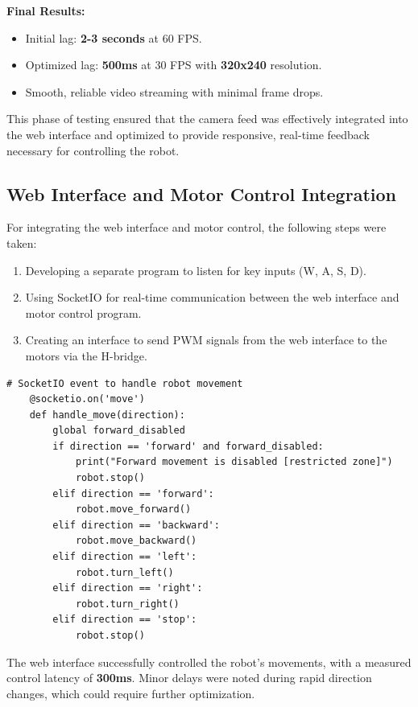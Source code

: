 \textbf{Final Results:}
\begin{itemize}
	\item Initial lag: \textbf{2-3 seconds} at 60 FPS.
	\item Optimized lag: \textbf{500ms} at 30 FPS with \textbf{320x240} resolution.
	\item Smooth, reliable video streaming with minimal frame drops.
\end{itemize}

This phase of testing ensured that the camera feed was effectively integrated into the web interface and optimized to provide responsive, real-time feedback necessary for controlling the robot.


\subsection{Web Interface and Motor Control Integration}

For integrating the web interface and motor control, the following steps were taken:

\begin{enumerate}
	\item Developing a separate program to listen for key inputs (W, A, S, D).
	\item Using SocketIO for real-time communication between the web interface and motor control program.
	\item Creating an interface to send PWM signals from the web interface to the motors via the H-bridge.
\end{enumerate}


\begin{lstlisting}[style=pythonstyle, caption=SocketIO event handler for robot movement]
	# SocketIO event to handle robot movement
	@socketio.on('move')
	def handle_move(direction):
		global forward_disabled
		if direction == 'forward' and forward_disabled:
			print("Forward movement is disabled [restricted zone]")
			robot.stop()
		elif direction == 'forward':
			robot.move_forward()
		elif direction == 'backward':
			robot.move_backward()
		elif direction == 'left':
			robot.turn_left()
		elif direction == 'right':
			robot.turn_right()
		elif direction == 'stop':
			robot.stop()
\end{lstlisting}



The web interface successfully controlled the robot's movements, with a measured control latency of \textbf{300ms}. Minor delays were noted during rapid direction changes, which could require further optimization.

